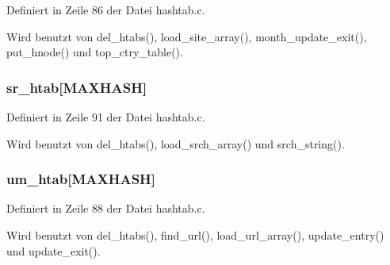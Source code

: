 Definiert in Zeile 86 der Datei hashtab.c.

Wird benutzt von del\_\-htabs(), load\_\-site\_\-array(), month\_\-update\_\-exit(), put\_\-hnode() und top\_\-ctry\_\-table().
\subsubsection{ {\bf sr\_\-htab}[MAXHASH]}\label{hashtab_8c_e9a8ef54a4b421e3d16dc313f162ccff}




Definiert in Zeile 91 der Datei hashtab.c.

Wird benutzt von del\_\-htabs(), load\_\-srch\_\-array() und srch\_\-string().
\subsubsection{ {\bf um\_\-htab}[MAXHASH]}\label{hashtab_8c_2f99d64abd1711a4b10ee71d070811a7}




Definiert in Zeile 88 der Datei hashtab.c.

Wird benutzt von del\_\-htabs(), find\_\-url(), load\_\-url\_\-array(), update\_\-entry() und update\_\-exit().